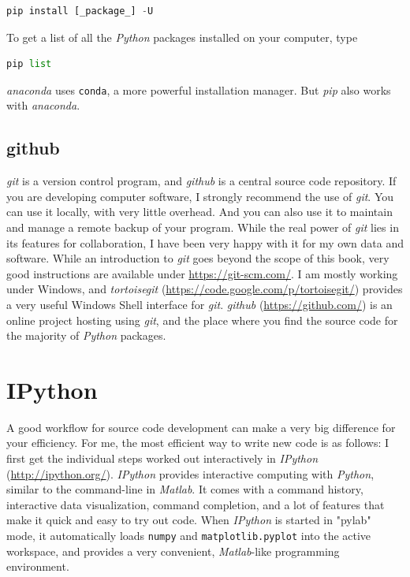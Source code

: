 \begin{lstlisting}[language=Python]
    pip install [_package_] -U
\end{lstlisting}

To get a list of all the \emph{Python} packages installed on your computer, type

\begin{lstlisting}[language=Python]
    pip list
\end{lstlisting}

\emph{anaconda} uses \lstinline{conda}, a more powerful installation manager. But \emph{pip} also works with \emph{anaconda}.

\subsection{github}

\emph{git} is a version control program, and \emph{github} is a central source code repository. If you are developing computer software, I strongly recommend the use of \emph{git}. You can use it locally, with very little overhead. And you can also use it to maintain and manage a remote backup of your program. While the real power of \emph{git} lies in its features for collaboration, I have been very happy with it for my own data and software. While an introduction to \emph{git} goes beyond the scope of this book, very good instructions are available under \url{https://git-scm.com/}. I am mostly working under Windows, and \emph{tortoisegit} (\url{https://code.google.com/p/tortoisegit/}) provides a very useful Windows Shell interface for \emph{git}. \emph{github} (\url{https://github.com/}) is an online project hosting using \emph{git}, and the place where you find the source code for the majority of \emph{Python} packages.

\section{IPython}

A good workflow for source code development can make a very big difference for your efficiency. For me, the most efficient way to write new code is as follows: I first get the individual steps worked out interactively in \emph{\Gls{IPython}} (\url{http://ipython.org/}). \emph{IPython }provides interactive computing with \emph{Python}, similar to the command-line in \emph{Matlab}. It comes with a command history, interactive data visualization, command completion, and a lot of features that make it quick and easy to try out code. When \emph{IPython} is started in "\gls{pylab}" mode, it automatically loads \lstinline{numpy} and \lstinline{matplotlib.pyplot} into the active workspace, and provides a very convenient, \emph{Matlab}-like programming environment.

